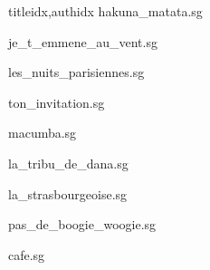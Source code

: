 \documentclass[
    ]{article}
\begin{document}
\begin{songs}{titleidx,authidx}
{hakuna_matata.sg}


{je_t_emmene_au_vent.sg}


{les_nuits_parisiennes.sg}


{ton_invitation.sg}


{macumba.sg}


{la_tribu_de_dana.sg}


{la_strasbourgeoise.sg}


{pas_de_boogie_woogie.sg}


{cafe.sg}



\end{songs}
\end{document}
